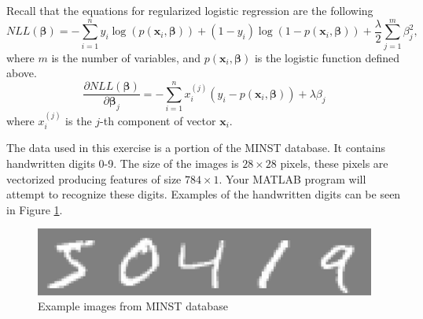 \documentclass[11pt,oneside,a4paper]{article}
\begin{document}
\begin{enumerate}
  Recall that the equations for regularized logistic regression are the following
    \begin{equation}\nonumber
    NLL(\pmb{\beta})=-\sum_{i=1}^{n}y_i \log\left(p(\mathbf{x}_i, \pmb{\beta} )  \right)+(1-y_i)\log\left(1-p(\mathbf{x}_i, \pmb{\beta} )  \right) + \frac{\lambda}{2}\sum_{j=1}^{m}\beta_j^2,
    \end{equation}  
    where $m$ is the number of variables, and $p(\mathbf{x}_i, \pmb{\beta} )$ is the logistic function defined above.
      \begin{equation}\nonumber
   \frac{\partial NLL(\pmb{\beta})}{\partial \pmb{\beta}_j}=-\sum_{i=1}^{n} {x}_i^{(j)}\left(y_i-p(\mathbf{x}_i, \pmb{\beta} )  \right)+\lambda \beta_j
   \end{equation}  
  where $x_i^{(j)}$ is the $j$-th component of vector $\mathbf{x}_i$.

  The data used in this exercise is a portion of the MINST database. It contains handwritten digits 0-9. The size of the images is $28\times 28$ pixels, these pixels are vectorized producing features of size $784\times1$. Your MATLAB program will attempt to recognize these digits. Examples of the handwritten digits can be seen in Figure \ref{fig:MINSTimages}. 
  \begin{figure}\centering
  			\includegraphics[height=0.12\textwidth]{digits.eps}
  			\caption{Example images from MINST database}
  			\label{fig:MINSTimages}
   \end{figure}


\end{enumerate}
\end{document}
